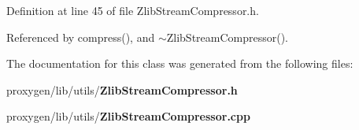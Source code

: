 Definition at line 45 of file Zlib\+Stream\+Compressor.\+h.



Referenced by compress(), and $\sim$\+Zlib\+Stream\+Compressor().



The documentation for this class was generated from the following files\+:\begin{DoxyCompactItemize}
\item 
proxygen/lib/utils/{\bf Zlib\+Stream\+Compressor.\+h}\item 
proxygen/lib/utils/{\bf Zlib\+Stream\+Compressor.\+cpp}\end{DoxyCompactItemize}
